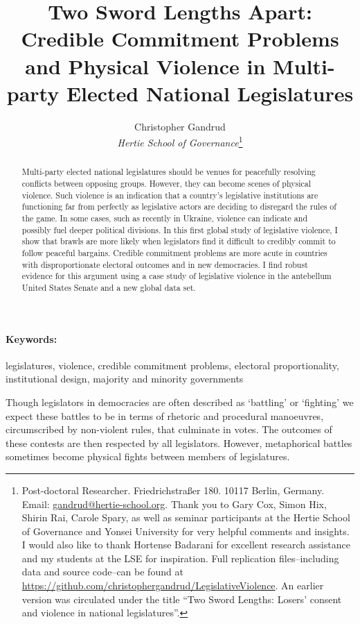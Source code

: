\documentclass[a4paper]{article}\usepackage[]{graphicx}\usepackage[]{color}
\title{Two Sword Lengths Apart: Credible Commitment Problems and Physical Violence in Multi-party Elected National Legislatures}
\author{Christopher Gandrud \\
                {\emph{Hertie School of Governance}}\footnote{Post-doctoral Researcher. Friedrichstra{\ss}er 180. 10117 Berlin, Germany. Email: \href{mailto:gandrud@hertie-school.org}{gandrud@hertie-school.org}. Thank you to Gary Cox, Simon Hix, Shirin Rai, Carole Spary, as well as seminar participants at the Hertie School of Governance and Yonsei University for very helpful comments and insights. I would also like to thank Hortense Badarani for excellent research assistance and my students at the LSE for inspiration. Full replication files--including data and source code--can be found at \url{https://github.com/christophergandrud/LegislativeViolence}. An earlier version was circulated under the title ``Two Sword Lengths: Losers' consent and violence in national legislatures''.}}
\begin{document}
\maketitle

\begin{abstract}
Multi-party elected national legislatures should be venues for peacefully resolving conflicts between opposing groups. However, they can become scenes of physical violence. Such violence is an indication that a country's legislative institutions are functioning far from perfectly as legislative actors are deciding to disregard the rules of the game. In some cases, such as recently in Ukraine, violence can indicate and possibly fuel deeper political divisions. In this first global study of legislative violence, I show that brawls are more likely when legislators find it difficult to credibly commit to follow peaceful bargains. Credible commitment problems are more acute in countries with disproportionate electoral outcomes and in new democracies. I find robust evidence for this argument using a case study of legislative violence in the antebellum United States Senate and a new global data set.
\end{abstract}


\paragraph{Keywords:} legislatures, violence, credible commitment problems, electoral proportionality, institutional design, majority and minority governments

\vspace{0.3cm}


Though legislators in democracies are often described as `battling' or `fighting' we expect these battles to be in terms of rhetoric and procedural manoeuvres, circumscribed by non-violent rules, that culminate in votes. The outcomes of these contests are then respected by all legislators. However, metaphorical battles sometimes become physical fights between members of legislatures.
\end{document}
